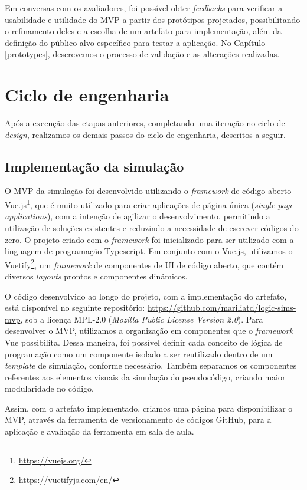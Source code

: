 Em conversas com os avaliadores, foi possível obter \textit{feedbacks} para verificar a usabilidade e utilidade do MVP a partir dos protótipos projetados, possibilitando o refinamento deles e a escolha de um artefato para implementação, além da definição do público alvo específico para testar a aplicação. No Capítulo \ref{prototypes}, descrevemos o processo de validação e as alterações realizadas. 

\section{Ciclo de engenharia}

Após a execução das etapas anteriores, completando uma iteração no ciclo de \textit{design}, realizamos os demais passos do ciclo de engenharia, descritos a seguir.

\subsection{Implementação da simulação}
O MVP da simulação foi desenvolvido utilizando o \textit{framework} de código aberto Vue.js\footnote{\url{https://vuejs.org/}}, que é muito utilizado para criar aplicações de página única (\textit{single-page applications}), com a intenção de agilizar o desenvolvimento, permitindo a utilização de soluções existentes e reduzindo a necessidade de escrever códigos do zero. O projeto criado com o \textit{framework} foi inicializado para ser utilizado com a linguagem de programação Typescript. Em conjunto com o Vue.js, utilizamos o Vuetify\footnote{\url{https://vuetifyjs.com/en/}}, um \textit{framework} de componentes de UI de código aberto, que contém diversos \textit{layouts} prontos e componentes dinâmicos.

O código desenvolvido ao longo do projeto, com a implementação do artefato, está disponível no seguinte repositório: \url{https://github.com/mariliatd/logic-sims-mvp}, sob a licença MPL-2.0 (\textit{Mozilla Public License Version 2.0}). Para desenvolver o MVP, utilizamos a organização em componentes que o \textit{framework} Vue possibilita. Dessa maneira, foi possível definir cada conceito de lógica de programação como um componente isolado a ser reutilizado dentro de um \textit{template} de simulação, conforme necessário. Também separamos os componentes referentes aos elementos visuais da simulação do pseudocódigo, criando maior modularidade no código.

Assim, com o artefato implementado, criamos uma página para disponibilizar o MVP, através da ferramenta de versionamento de códigos GitHub, para a aplicação e avaliação da ferramenta em sala de aula.

